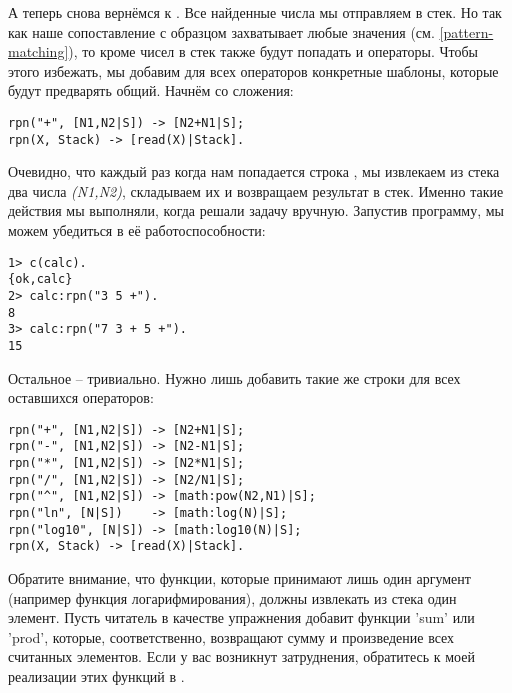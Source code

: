 А теперь снова вернёмся к .
Все найденные числа мы отправляем в стек.
Но так как наше сопоставление с образцом захватывает любые значения (см. \ref{pattern-matching}), то кроме чисел в стек также будут попадать и операторы.
Чтобы этого избежать, мы добавим для всех операторов конкретные шаблоны, которые будут предварять общий.
Начнём со сложения:
\begin{lstlisting}[style=erlang]
rpn("+", [N1,N2|S]) -> [N2+N1|S];
rpn(X, Stack) -> [read(X)|Stack].
\end{lstlisting}

Очевидно, что каждый раз когда нам попадается строка , мы извлекаем из стека два числа \emph{(N1,N2)}, складываем их и возвращаем результат в стек.
Именно такие действия мы выполняли, когда решали задачу вручную.
Запустив программу, мы можем убедиться в её работоспособности:
\begin{lstlisting}[style=erlang]
1> c(calc).
{ok,calc}
2> calc:rpn("3 5 +").
8
3> calc:rpn("7 3 + 5 +").
15
\end{lstlisting}

Остальное \--- тривиально.
Нужно  лишь добавить такие же строки для всех оставшихся  операторов:
\begin{lstlisting}[style=erlang]
rpn("+", [N1,N2|S]) -> [N2+N1|S];
rpn("-", [N1,N2|S]) -> [N2-N1|S];
rpn("*", [N1,N2|S]) -> [N2*N1|S];
rpn("/", [N1,N2|S]) -> [N2/N1|S];
rpn("^", [N1,N2|S]) -> [math:pow(N2,N1)|S];
rpn("ln", [N|S])    -> [math:log(N)|S];
rpn("log10", [N|S]) -> [math:log10(N)|S];
rpn(X, Stack) -> [read(X)|Stack].
\end{lstlisting}

Обратите внимание, что функции, которые принимают лишь один аргумент (например функция логарифмирования), должны извлекать из стека один элемент.
Пусть читатель в качестве упражнения добавит функции 'sum' или 'prod', которые, соответственно, возвращают сумму и произведение всех считанных элементов.
Если у вас возникнут затруднения, обратитесь к моей реализации этих функций в .

